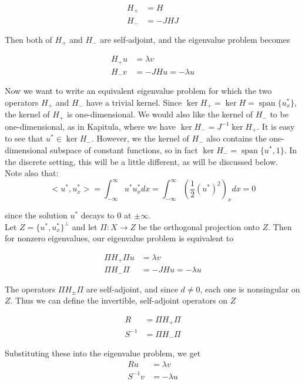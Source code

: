 \documentclass[12pt]{article}
\DeclareMathOperator{\spn}{span}
\begin{document}
\begin{align}
H_+ &= H \\
H_- &= -JHJ
\end{align}

Then both of $H_+$ and $H_-$ are self-adjoint, and the eigenvalue problem becomes

\begin{align}
H_+ u &= \lambda v \\
H_- v &= -JHu = -\lambda u
\end{align}

Now we want to write an equivalent eigenvalue problem for which the two operators $H_+$ and $H_-$ have a trivial kernel. Since $\ker H_+ = \ker H = \spn \{u^*_x\}$, the kernel of $H_+$ is one-dimensional. We would also like the kernel of $H_-$ to be one-dimensional, as in Kapitula, where we have $\ker H_- = J^{-1} \ker H_+$. It is easy to see that $u^* \in \ker H_-$. However, we the kernel of $H_-$ also contains the one-dimensional subspace of constant functions, so in fact $\ker H_- = \spn \{u^*, 1\}$. In the discrete setting, this will be a little different, as will be discussed below.\\

Note also that:
\[
<u^*, u^*_x> = \int_{-\infty}^{\infty}u^* u^*_x dx = \int_{-\infty}^{\infty} \left(\frac{1}{2} (u^*)^2\right)_x dx = 0 
\]

since the solution $u^*$ decays to 0 at $\pm \infty$.\\

Let $Z = \{u^*, u^*_x\}^\perp$ and let $\Pi: X \rightarrow Z$ be the orthogonal projection onto $Z$. Then for nonzero eigenvalues, our eigenvalue problem is equivalent to 

\begin{align}
\Pi H_+ \Pi u &= \lambda v \\
\Pi H_- \Pi &= -JHu = -\lambda u
\end{align}

The operators $\Pi H_\pm \Pi$ are self-adjoint, and since $d \neq 0$, each one is nonsingular on $Z$. Thus we can define the invertible, self-adjoint operators on $Z$

\begin{align}
R &= \Pi H_+ \Pi  \\
S^{-1} &= \Pi H_- \Pi
\end{align}

Substituting these into the eigenvalue problem, we get
\begin{align}
R u &= \lambda v \\
S^{-1} v &= -\lambda u
\end{align}
\end{document}
